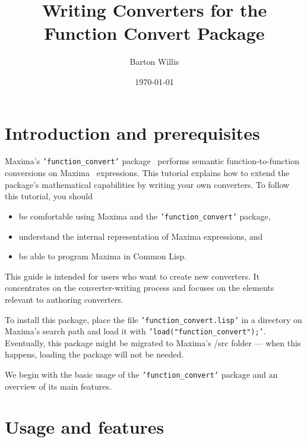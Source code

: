 \documentclass[12pt,fleqn]{extarticle}
\title{Writing Converters for the Function Convert Package}
\author{Barton Willis}
\date{\today}
\newcommand{\ttq}[1]{\texttt{'#1'}}
\newcommand{\funconvert}{\ttq{function\_convert}{ }}
\begin{document}
\maketitle
\tableofcontents


\section{Introduction and prerequisites}

Maxima’s \funconvert package~\cite{willis-function-convert} performs semantic function-to-function conversions on Maxima~\cite{maxima} expressions. This tutorial explains how to extend the package’s mathematical capabilities by writing your own converters. To follow this tutorial, you should 
\begin{itemize}
  \item be comfortable using Maxima and the \funconvert package,
  \item understand the internal representation of Maxima expressions, and
  \item be able to program Maxima in Common Lisp.
\end{itemize}

This guide is intended for users who want to create new converters. It concentrates on the converter-writing process and focuses on the elements relevant to authoring converters.

To install this package, place the file \ttq{function\_convert.lisp} in a directory on Maxima’s search path and load it with  \ttq{load("function\_convert");}.  Eventually, this package might be migrated to 
Maxima's /src folder --- when this happens, loading the package will not be needed.

We begin with the basic usage of the \funconvert package and an overview of its main features.


\section{Usage and features}
\end{document}
